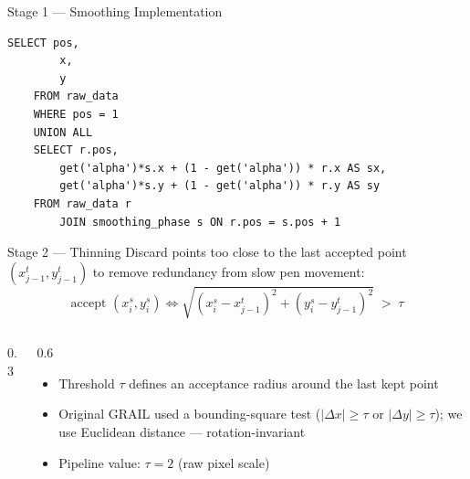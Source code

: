 \documentclass[aspectratio=169, 12pt]{beamer}
\begin{document}
\begin{frame}[fragile]{Stage 1 — Smoothing Implementation}
  \begin{lstlisting}[basicstyle=\ttfamily\footnotesize]
SELECT pos,
        x,
        y
    FROM raw_data
    WHERE pos = 1
    UNION ALL
    SELECT r.pos,
        get('alpha')*s.x + (1 - get('alpha')) * r.x AS sx,
        get('alpha')*s.y + (1 - get('alpha')) * r.y AS sy
    FROM raw_data r
        JOIN smoothing_phase s ON r.pos = s.pos + 1
  \end{lstlisting}
\end{frame}

\begin{frame}[fragile]{Stage 2 — Thinning}
  Discard points too close to the last accepted point $(x^t_{j-1}, y^t_{j-1})$
  to remove redundancy from slow pen movement:
  \[
    \text{accept } (x^s_i, y^s_i)
    \iff
    \sqrt{(x^s_i - x^t_{j-1})^2 + (y^s_i - y^t_{j-1})^2} \;>\; \tau
  \]

  \begin{columns}
    \begin{column}{0.3\textwidth}
    \end{column}

    \begin{column}{0.6\textwidth}
      \begin{itemize}
        \item Threshold $\tau$ defines an acceptance radius around the last kept point
        \item Original GRAIL used a bounding-square test ($|\Delta x| \geq \tau$ or $|\Delta y| \geq \tau$);
              we use Euclidean distance — rotation-invariant
        \item Pipeline value: $\tau = 2$ (raw pixel scale)
      \end{itemize}
    \end{column}
  \end{columns}
\end{frame}
\end{document}
